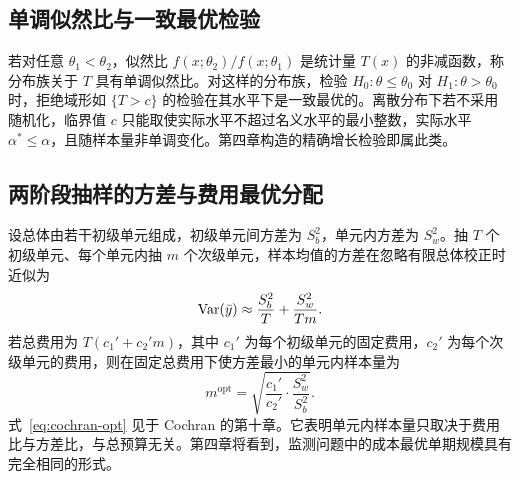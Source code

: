 \subsection{单调似然比与一致最优检验}

若对任意 $\theta_1<\theta_2$，似然比 $f(x;\theta_2)/f(x;\theta_1)$ 是统计量 $T(x)$ 的非减函数，称分布族关于 $T$ 具有单调似然比。对这样的分布族，检验 $H_0:\theta\le\theta_0$ 对 $H_1:\theta>\theta_0$ 时，拒绝域形如 $\{T>c\}$ 的检验在其水平下是一致最优的\citep{karlin1956theory, lehmann2005testing}。离散分布下若不采用随机化，临界值 $c$ 只能取使实际水平不超过名义水平的最小整数，实际水平 $\alpha^*\le\alpha$，且随样本量非单调变化。第四章构造的精确增长检验即属此类。

\subsection{两阶段抽样的方差与费用最优分配}

设总体由若干初级单元组成，初级单元间方差为 $S_b^2$，单元内方差为 $S_w^2$。抽 $T$ 个初级单元、每个单元内抽 $m$ 个次级单元，样本均值的方差在忽略有限总体校正时近似为
\begin{equation}
  \operatorname{Var}(\bar{y})\approx\frac{S_b^2}{T}+\frac{S_w^2}{Tm}.
  \label{eq:two-stage}
\end{equation}
若总费用为 $T(c_1'+c_2'm)$，其中 $c_1'$ 为每个初级单元的固定费用，$c_2'$ 为每个次级单元的费用，则在固定总费用下使方差最小的单元内样本量为
\begin{equation}
  m^{\mathrm{opt}}=\sqrt{\frac{c_1'}{c_2'}\cdot\frac{S_w^2}{S_b^2}}.
  \label{eq:cochran-opt}
\end{equation}
式~\eqref{eq:cochran-opt} 见于 Cochran 的第十章\citep{cochran1977sampling}。它表明单元内样本量只取决于费用比与方差比，与总预算无关。第四章将看到，监测问题中的成本最优单期规模具有完全相同的形式。
